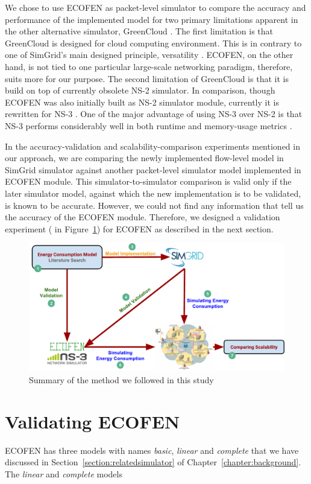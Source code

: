 We chose to use ECOFEN as packet-level simulator to compare the accuracy and performance of the implemented model for two primary limitations apparent in the other alternative simulator, GreenCloud \cite{DBLP:journals/tjs/KliazovichBK12}. The first limitation is that GreenCloud is designed for cloud computing environment. This is in contrary to one of SimGrid's main designed principle, versatility \cite{DBLP:journals/jpdc/CasanovaGLQS14}. ECOFEN, on the other hand, is not tied to one particular large-scale networking paradigm, therefore, suits more for our purpose. The second limitation of GreenCloud is that it is build on top of currently obsolete NS-2 simulator. In comparison, though ECOFEN was also initially built as NS-2 simulator module, currently it is rewritten for NS-3 \cite{DBLP:conf/cloudnet/CorneaOL14}. One of the major advantage of using NS-3 over NS-2 is that NS-3 performs considerably well in both runtime and memory-usage metrics \cite{DBLP:conf/icc/WeingartnerLW09}.

In the accuracy-validation and scalability-comparison experiments mentioned in our approach, we are comparing the newly implemented flow-level model in SimGrid simulator against another packet-level simulator model implemented in ECOFEN module. This simulator-to-simulator comparison is valid only if the later simulator model, against which the new implementation is to be validated, is known to be accurate. However, we could not find any information that tell us the accuracy of the ECOFEN module. Therefore, we designed a validation experiment ( in Figure~\ref{fig:approach}) for ECOFEN as described in the next section. 

\begin{figure}[ht]
	\begin{center}
		\includegraphics[width=16cm]{images/approach.pdf}
		\caption{Summary of the method we followed in this study}
		\label{fig:approach}
	\end{center}
\end{figure}
\section{Validating ECOFEN}
 ECOFEN has three models with names \emph{basic}, \emph{linear} and \emph{complete} that we have discussed in Section~\ref{section:relatedsimulator} of Chapter~\ref{chapter:background}. The \emph{linear} and \emph{complete} models